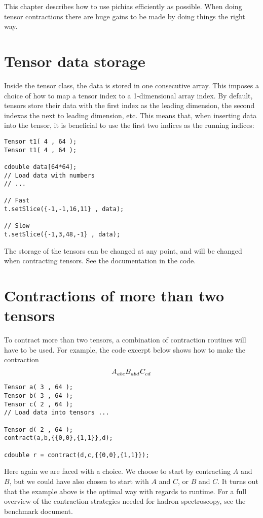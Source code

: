 \documentclass[paper=a4, oneside]{memoir}
\newcommand{\tens}[2]{\tensor{#1}{#2}}
\newcommand{\packagename}{pichi}
\begin{document}
This chapter describes how to use \packagename as efficiently as possible. When 
doing tensor contractions there are huge gains to be made by doing things the 
right way.

\section*{Tensor data storage}

Inside the tensor class, the data is stored in one consecutive array. This 
imposes a choice of how to map a tensor index to a 1-dimensional array index. 
By default, tensors store their data with the first index as the leading 
dimension, the second indexas the next to leading dimension, etc. This means 
that, when inserting data into the tensor, it is beneficial to use the first 
two indices as the running indices:

\begin{lstlisting}
Tensor t1( 4 , 64 );
Tensor t1( 4 , 64 );

cdouble data[64*64];
// Load data with numbers
// ...

// Fast
t.setSlice({-1,-1,16,11} , data);

// Slow
t.setSlice({-1,3,48,-1} , data); 
\end{lstlisting}

The storage of the tensors can be changed at any point, and will be changed 
when contracting tensors. See the documentation in the code.

\section*{Contractions of more than two tensors}

To contract more than two tensors, a combination of contraction routines will 
have to be used. For example, the code excerpt below shows how to make the 
contraction
\begin{equation}
\tens{A}{_a_b_c} \tens{B}{_a_b_d} \tens{C}{_c_d}
\end{equation}

\begin{lstlisting}
Tensor a( 3 , 64 );
Tensor b( 3 , 64 );
Tensor c( 2 , 64 );
// Load data into tensors ...

Tensor d( 2 , 64 );
contract(a,b,{{0,0},{1,1}},d);

cdouble r = contract(d,c,{{0,0},{1,1}});
\end{lstlisting}

Here again we are faced with a choice. We choose to start by contracting $A$ 
and $B$, but we could have also chosen to start with $A$ and $C$, or $B$ and 
$C$. It turns out that the example above is the optimal way with regards to 
runtime. For a full overview of the contraction strategies needed for hadron 
spectroscopy, see the benchmark document.
\end{document}
